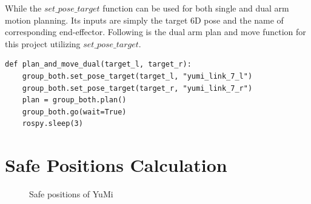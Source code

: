 While the $set\_pose\_target$ function can be used for both single and dual arm motion planning. Its inputs are simply the target 6D pose and the name of corresponding end-effector. Following is the dual arm plan and move function for this project utilizing $set\_pose\_target$. 

\begin{verbatim}
def plan_and_move_dual(target_l, target_r):
    group_both.set_pose_target(target_l, "yumi_link_7_l")
    group_both.set_pose_target(target_r, "yumi_link_7_r")
    plan = group_both.plan()
    group_both.go(wait=True)
    rospy.sleep(3)
\end{verbatim}



\section{Safe Positions Calculation} \label{safetyposescalculation}

\begin{figure}[H]
\centering
{}
\caption{Safe positions of YuMi}
\label{safeposition}
\end{figure}

